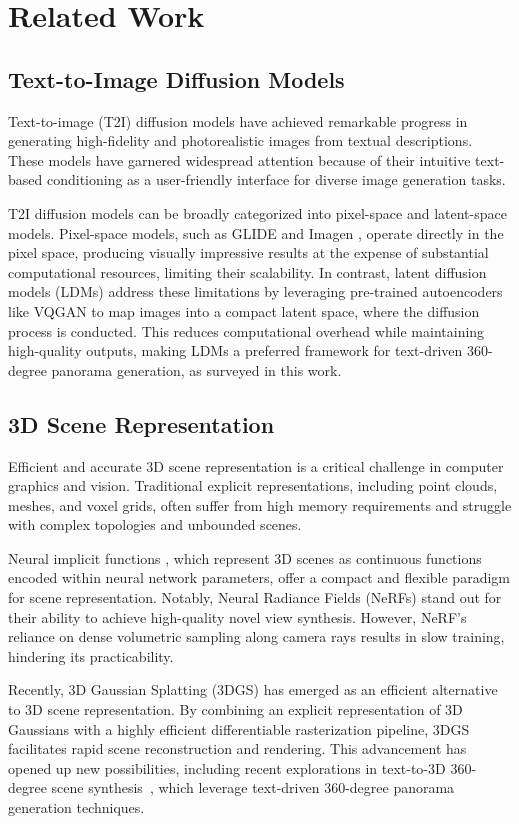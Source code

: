 \section{Related Work}
\subsection{Text-to-Image Diffusion Models}

Text-to-image (T2I) diffusion models \cite{glide,imagen,dall-e2,latentdiffusion,sdxl} have achieved remarkable progress in generating high-fidelity and photorealistic images from textual descriptions. These models have garnered widespread attention because of their intuitive text-based conditioning as a user-friendly interface for diverse image generation tasks.

T2I diffusion models can be broadly categorized into pixel-space and latent-space models. Pixel-space models, such as GLIDE \cite{glide} and Imagen \cite{imagen}, operate directly in the pixel space, producing visually impressive results at the expense of substantial computational resources, limiting their scalability. In contrast, latent diffusion models (LDMs) \cite{latentdiffusion} address these limitations by leveraging pre-trained autoencoders like VQGAN \cite{vqgan} to map images into a compact latent space, where the diffusion process is conducted. This reduces computational overhead while maintaining high-quality outputs, making LDMs a preferred framework for text-driven 360-degree panorama generation, as surveyed in this work.

\subsection{3D Scene Representation}

Efficient and accurate 3D scene representation is a critical challenge in computer graphics and vision. Traditional explicit representations, including point clouds, meshes, and voxel grids, often suffer from high memory requirements and struggle with complex topologies and unbounded scenes.

Neural implicit functions \cite{sdf,occupancy,3dgen}, which represent 3D scenes as continuous functions encoded within neural network parameters, offer a compact and flexible paradigm for scene representation. Notably, Neural Radiance Fields (NeRFs) \cite{nerf} stand out for their ability to achieve high-quality novel view synthesis. However, NeRF's reliance on dense volumetric sampling along camera rays results in slow training, hindering its practicability.

Recently, 3D Gaussian Splatting (3DGS) \cite{3dgs} has emerged as an efficient alternative to 3D scene representation. By combining an explicit representation of 3D Gaussians with a highly efficient differentiable rasterization pipeline, 3DGS facilitates rapid scene reconstruction and rendering. This advancement has opened up new possibilities, including recent explorations in text-to-3D 360-degree scene synthesis~\cite{dreamscene360,scenedreamer360}, which leverage text-driven 360-degree panorama generation techniques.
